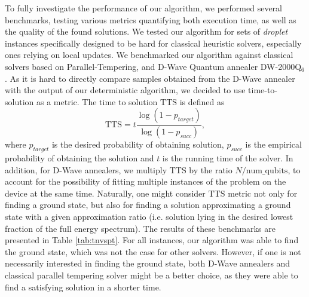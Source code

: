 To fully investigate the performance of our algorithm, we performed several
benchmarks, testing various metrics quantifying both execution time, as well as
the quality of the found solutions. We tested our algorithm for sets of
\emph{droplet} instances specifically designed to be hard for classical
heuristic solvers, especially ones relying on local updates. We benchmarked our
algorithm against classical solvers based on Parallel-Tempering, and D-Wave
Quantum annealer DW-2000Q$_6$. As it is hard to directly compare samples
obtained from the D-Wave annealer with the output of our deterministic
algorithm, we decided to use time-to-solution as a metric. The time to solution
$\mbox{TTS}$ is defined as
    \begin{equation}
      \label{eq:tts}
      \mbox{TTS} = t \frac{\log(1 - p_{target})}{\log(1 - p_{succ})},
    \end{equation}
    where $p_{target}$ is the desired probability of obtaining solution, $p_{succ}$
    is the empirical probability of obtaining the solution and $t$ is the running
    time of the solver. In addition, for D-Wave annealers, we multiply $\mbox{TTS}$
    by the ratio $N/\mbox{num\_qubits}$, to account for the possibility of fitting
    multiple instances of the problem on the device at the same time. Naturally,
    one might consider $\mbox{TTS}$ metric not only for finding a ground state, but
also for finding a solution approximating a ground state with a given
approximation ratio (i.e. solution lying in the desired lowest fraction of the
full energy spectrum). The results of these benchmarks are presented in Table
\ref{tab:tnvspt}. For all instances, our algorithm was able to find the ground
state, which was not the case for other solvers. However, if one is not
necessarily interested in finding the ground state, both D-Wave annealers and
classical parallel tempering solver might be a better choice, as they were able
to find a satisfying solution in a shorter time.
